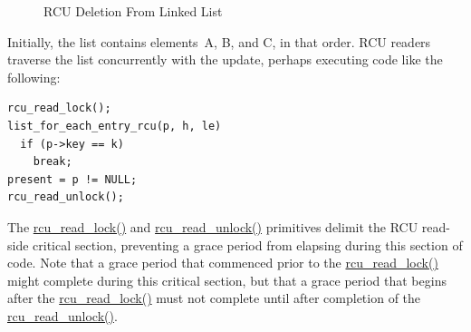 \begin{figure}[htb]
\begin{center}
\end{center}
\caption{RCU Deletion From Linked List}
\label{fig:advsync:RCU Deletion From Linked List}
\end{figure}

Initially, the list contains elements~A, B, and C, in that order.
RCU readers traverse the list concurrently with the update,
perhaps executing code like the following:

\vspace{5pt}
\begin{minipage}[t]{\columnwidth}
\begin{verbatim}
rcu_read_lock();
list_for_each_entry_rcu(p, h, le)
  if (p->key == k)
  	break;
present = p != NULL;
rcu_read_unlock();
\end{verbatim}
\end{minipage}
\vspace{5pt}

The \url{rcu_read_lock()} and \url{rcu_read_unlock()} primitives
delimit the RCU read-side critical section, preventing a grace
period from elapsing during this section of code.
Note that a grace period that commenced prior to the \url{rcu_read_lock()}
might complete during this critical section, but that a grace period
that begins after the \url{rcu_read_lock()} must not complete until
after completion of the \url{rcu_read_unlock()}.

